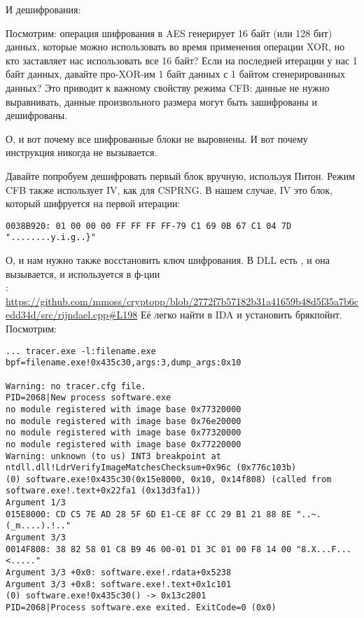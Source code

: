 \begin{figure}[H]
\centering
{}
\end{figure}

И дешифрования:

\begin{figure}[H]
\centering
{}
\label{fig:CFB_decryption}
\end{figure}

Посмотрим: операция шифрования в AES генерирует 16 байт (или 128 бит)  данных,
которые можно использовать во время применения операции XOR, но кто заставляет нас использовать все 16 байт?
Если на последней итерации у нас 1 байт данных, давайте про-XOR-им 1 байт данных с 1 байтом сгенерированных
 данных?
Это приводит к важному свойству режима \ac{CFB}: данные не нужно выравнивать, данные произвольного размера
могут быть зашифрованы и дешифрованы.

О, и вот почему все шифрованные блоки не выровнены.
И вот почему инструкция  никогда не вызывается.

Давайте попробуем дешифровать первый блок вручную, используя Питон.
Режим \ac{CFB} также использует \ac{IV}, как  для \ac{CSPRNG}.
В нашем случае, \ac{IV} это блок, который шифруется на первой итерации:

\begin{lstlisting}
0038B920: 01 00 00 00 FF FF FF FF-79 C1 69 0B 67 C1 04 7D "........y.i.g..}"
\end{lstlisting}

О, и нам нужно также восстановить ключ шифрования.
В DLL есть , и она вызывается, и используется в ф-ции \\
:\\
\url{https://github.com/mmoss/cryptopp/blob/2772f7b57182b31a41659b48d5f35a7b6cedd34d/src/rijndael.cpp#L198}
Её легко найти в IDA и установить брякпойнт. Посмотрим:

\begin{lstlisting}
... tracer.exe -l:filename.exe bpf=filename.exe!0x435c30,args:3,dump_args:0x10

Warning: no tracer.cfg file.
PID=2068|New process software.exe
no module registered with image base 0x77320000
no module registered with image base 0x76e20000
no module registered with image base 0x77320000
no module registered with image base 0x77220000
Warning: unknown (to us) INT3 breakpoint at ntdll.dll!LdrVerifyImageMatchesChecksum+0x96c (0x776c103b)
(0) software.exe!0x435c30(0x15e8000, 0x10, 0x14f808) (called from software.exe!.text+0x22fa1 (0x13d3fa1))
Argument 1/3 
015E8000: CD C5 7E AD 28 5F 6D E1-CE 8F CC 29 B1 21 88 8E "..~.(_m....).!.."
Argument 3/3 
0014F808: 38 82 58 01 C8 B9 46 00-01 D1 3C 01 00 F8 14 00 "8.X...F...<....."
Argument 3/3 +0x0: software.exe!.rdata+0x5238
Argument 3/3 +0x8: software.exe!.text+0x1c101
(0) software.exe!0x435c30() -> 0x13c2801
PID=2068|Process software.exe exited. ExitCode=0 (0x0)
\end{lstlisting}


